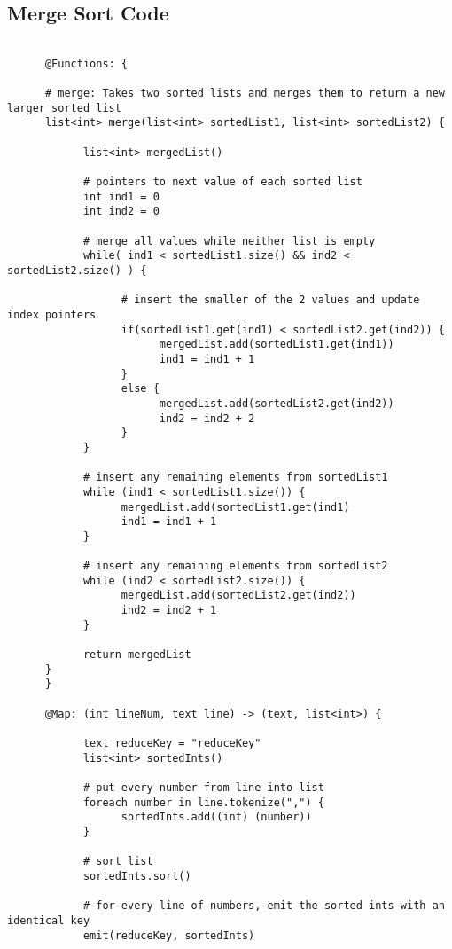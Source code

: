 \documentclass{article}
\begin{document}
\subsection*{Merge Sort Code}
\begin{verbatim}
      
      @Functions: {
	  
      # merge: Takes two sorted lists and merges them to return a new larger sorted list
      list<int> merge(list<int> sortedList1, list<int> sortedList2) {
      	  
            list<int> mergedList()
	
            # pointers to next value of each sorted list
            int ind1 = 0
            int ind2 = 0

            # merge all values while neither list is empty
            while( ind1 < sortedList1.size() && ind2 < sortedList2.size() ) {

                  # insert the smaller of the 2 values and update index pointers
                  if(sortedList1.get(ind1) < sortedList2.get(ind2)) {
                        mergedList.add(sortedList1.get(ind1))
                        ind1 = ind1 + 1
                  }
                  else { 
                        mergedList.add(sortedList2.get(ind2))
                        ind2 = ind2 + 2
                  }
            }
            
            # insert any remaining elements from sortedList1
            while (ind1 < sortedList1.size()) {
                  mergedList.add(sortedList1.get(ind1)
		          ind1 = ind1 + 1
		    }
		
		    # insert any remaining elements from sortedList2
            while (ind2 < sortedList2.size()) {
                  mergedList.add(sortedList2.get(ind2))
		          ind2 = ind2 + 1
		    }
	        
	        return mergedList
      }
      }
      
      @Map: (int lineNum, text line) -> (text, list<int>) {

            text reduceKey = "reduceKey"
            list<int> sortedInts()
            
            # put every number from line into list
            foreach number in line.tokenize(",") {
                  sortedInts.add((int) (number))
            }
            
            # sort list
            sortedInts.sort()
            
            # for every line of numbers, emit the sorted ints with an identical key
            emit(reduceKey, sortedInts)
      

\end{verbatim}
\end{document}
